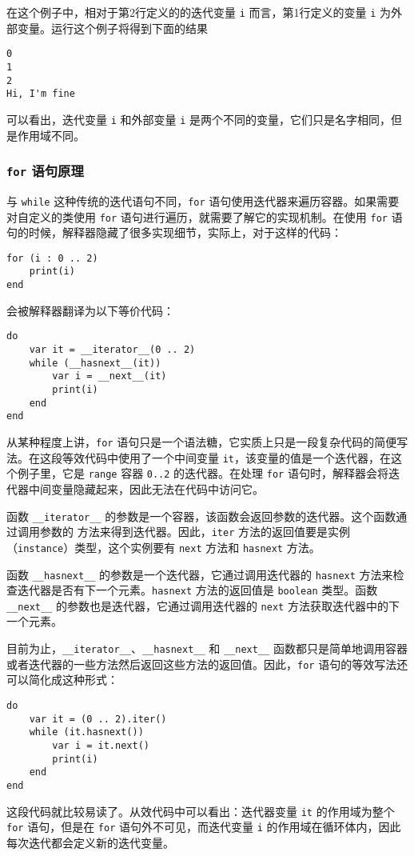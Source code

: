 在这个例子中，相对于第2行定义的的迭代变量 \texttt{i} 而言，第1行定义的变量 \texttt{i} 为外部变量。运行这个例子将得到下面的结果
\begin{lstlisting}[numbers=none]
0
1
2
Hi, I'm fine
\end{lstlisting}
可以看出，迭代变量 \texttt{i} 和外部变量 \texttt{i} 是两个不同的变量，它们只是名字相同，但是作用域不同。

\subsubsection{\texttt{for} 语句原理}

与 \texttt{while} 这种传统的迭代语句不同，\texttt{for} 语句使用迭代器来遍历容器。如果需要对自定义的类使用 \texttt{for} 语句进行遍历，就需要了解它的实现机制。在使用 \texttt{for} 语句的时候，解释器隐藏了很多实现细节，实际上，对于这样的代码：
\begin{lstlisting}[language=berry]
for (i : 0 .. 2)
    print(i)
end
\end{lstlisting}
会被解释器翻译为以下等价代码：
\begin{lstlisting}[language=berry]
do
    var it = __iterator__(0 .. 2)
    while (__hasnext__(it))
        var i = __next__(it)
        print(i)
    end
end
\end{lstlisting}

从某种程度上讲，\texttt{for} 语句只是一个语法糖，它实质上只是一段复杂代码的简便写法。在这段等效代码中使用了一个中间变量 \texttt{it}，该变量的值是一个迭代器，在这个例子里，它是 \texttt{range} 容器 \texttt{0..2} 的迭代器。在处理 \texttt{for} 语句时，解释器会将迭代器中间变量隐藏起来，因此无法在代码中访问它。

函数 \texttt{\_\_iterator\_\_} 的参数是一个容器，该函数会返回参数的迭代器。这个函数通过调用参数的  方法来得到迭代器。因此，\texttt{iter} 方法的返回值要是实例（\texttt{instance}）类型，这个实例要有 \texttt{next} 方法和 \texttt{hasnext} 方法。

函数 \texttt{\_\_hasnext\_\_} 的参数是一个迭代器，它通过调用迭代器的 \texttt{hasnext} 方法来检查迭代器是否有下一个元素。\texttt{hasnext} 方法的返回值是 \texttt{boolean} 类型。函数 \texttt{\_\_next\_\_} 的参数也是迭代器，它通过调用迭代器的 \texttt{next} 方法获取迭代器中的下一个元素。

目前为止，\texttt{\_\_iterator\_\_}、\texttt{\_\_hasnext\_\_} 和 \texttt{\_\_next\_\_} 函数都只是简单地调用容器或者迭代器的一些方法然后返回这些方法的返回值。因此，\texttt{for} 语句的等效写法还可以简化成这种形式：
\begin{lstlisting}[language=berry]
do
    var it = (0 .. 2).iter()
    while (it.hasnext())
        var i = it.next()
        print(i)
    end
end
\end{lstlisting}
这段代码就比较易读了。从效代码中可以看出：迭代器变量 \texttt{it} 的作用域为整个 \texttt{for} 语句，但是在 \texttt{for} 语句外不可见，而迭代变量 \texttt{i} 的作用域在循环体内，因此每次迭代都会定义新的迭代变量。

